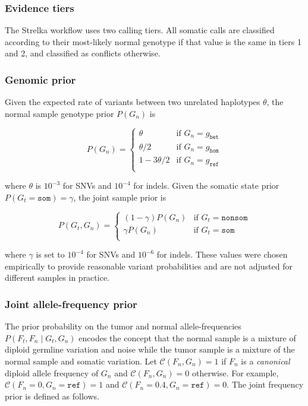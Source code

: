 \documentclass{article}
\begin{document}

\subsubsection{Evidence tiers}
\label{sec:SomaticEvidenceTiers}


The Strelka workflow uses two calling tiers. All somatic calls are classified according to their most-likely normal genotype if that value is the same in tiers 1 and 2, and classified as conflicts otherwise.

\subsubsection{Genomic prior}
Given the expected rate of variants between two unrelated haplotypes $\theta$, the normal sample genotype prior $P(G_n)$ is

\begin{equation*}
P(G_n)=
\begin{cases}
	\theta & \text{if } G_n = g_\texttt{het} \\
	\theta/2 & \text{if } G_n = g_\texttt{hom} \\
	1 - 3\theta/2 & \text{if } G_n = g_\texttt{ref} \\
\end{cases}
\end{equation*}

\noindent where $\theta$ is $10^{-3}$ for SNVs and $10^{-4}$ for indels. Given the somatic state prior $P(G_t=\texttt{som}) = \gamma$, the joint sample prior is

\begin{equation*}
P(G_t, G_n)=
\begin{cases}
	(1 - \gamma) P(G_n) & \text{if } G_t = \texttt{nonsom} \\
	\gamma P(G_n) & \text{if } G_t = \texttt{som} \\
\end{cases}
\end{equation*}

\noindent where $\gamma$ is set to $10^{-4}$ for SNVs and $10^{-6}$ for indels. These values were chosen empirically to provide reasonable variant probabilities and are not adjusted for different samples in practice.


\subsubsection{Joint allele-frequency prior}
The prior probability on the tumor and normal allele-frequencies $P(F_t, F_n \mid G_t, G_n)$ encodes the concept that the normal sample is a mixture of diploid germline variation and noise while the tumor sample is a mixture of the normal sample and somatic variation. Let $\mathcal{C} (F_n, G_n) = 1$ if $F_n$ is a {\em canonical} diploid allele frequency of $G_n$ and $\mathcal{C} (F_n, G_n) = 0$ otherwise. For example, $\mathcal{C} (F_n=0, G_n = \texttt{ref}) = 1$ and $\mathcal{C} (F_n=0.4, G_n = \texttt{ref}) = 0$. The joint frequency prior is defined as follows.
\end{document}
